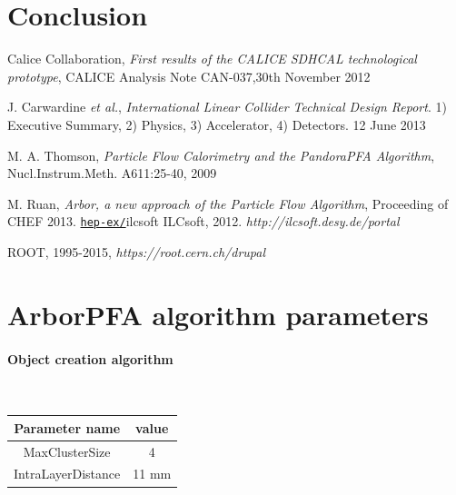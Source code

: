 \documentclass[cits]{JINST}
\begin{document}
\section{Conclusion} 


\begin{thebibliography}{6}
\renewcommand{\hepex}[1]{\href{http://www.arxiv.org/abs/#1}{\tt hep-ex/#1}}
\renewcommand{\physics}[1]{\href{http://www.arxiv.org/abs/#1}{\tt phys.int-det/#1}}
\newcommand\nim[4]{\href{http://dx.doi.org/10.1016/#4}
  {\emph{Nucl.\ Instrum.\ Meth.} {\bf #1} (#2) #3}}



Calice Collaboration, \emph{First results of the CALICE SDHCAL technological prototype}, CALICE Analysis Note CAN-037,30th November 2012


J. Carwardine {\it et al.},  \emph{International Linear Collider Technical Design Report}. 1) Executive Summary, 2) Physics, 3) Accelerator, 4) Detectors. 12 June 2013


M. A. Thomson, \emph{Particle Flow Calorimetry and the PandoraPFA Algorithm}, Nucl.Instrum.Meth. A611:25-40, 2009


M. Ruan, \emph{Arbor, a new approach of the Particle Flow Algorithm}, Proceeding of CHEF 2013. \hepex


\bibitem{ilcsoft}
ILCsoft, 2012. \textit{http://ilcsoft.desy.de/portal}


ROOT, 1995-2015, \textit{https://root.cern.ch/drupal}

\newpage

\end{thebibliography}


\clearpage
\appendix

\section{ArborPFA algorithm parameters}
\label{ARBOR_ALGORITHM_PARAMETERS}

\paragraph{Object creation algorithm} ~

\begin{table}[!h]
  \begin{center}
    \begin{tabu} to \linewidth { c | c } 
          Parameter name & value \\
          \hline
          MaxClusterSize & 4 \\
          IntraLayerDistance & 11 mm
    \end{tabu} 
  \end{center}
\end{table}
\end{document}
